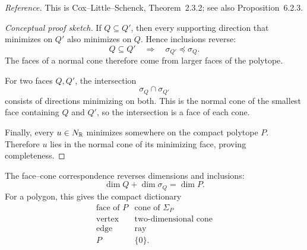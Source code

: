 \noindent
\textit{Reference.}
This is Cox--Little--Schenck, Theorem~2.3.2; see also
Proposition~6.2.3.

\begin{proof}[Conceptual proof sketch]
If \(Q\subseteq Q'\), then every supporting direction that minimizes
on \(Q'\) also minimizes on \(Q\). Hence inclusions reverse:
\[
Q\subseteq Q'
\quad\Longrightarrow\quad
\sigma_{Q'}\preceq\sigma_Q.
\]
The faces of a normal cone therefore come from larger faces of the
polytope.

For two faces \(Q,Q'\), the intersection
\[
\sigma_Q\cap\sigma_{Q'}
\]
consists of directions minimizing on both. This is the normal cone of
the smallest face containing \(Q\) and \(Q'\), so the intersection is
a face of each cone.

Finally, every \(u\in N_{\mathbb{R}}\) minimizes somewhere on the compact
polytope \(P\). Therefore \(u\) lies in the normal cone of its
minimizing face, proving completeness.
\end{proof}

The face--cone correspondence reverses dimensions and inclusions:
\[
\boxed{
\dim Q+\dim\sigma_Q=\dim P.
}
\]
For a polygon, this gives the compact dictionary
\[
\begin{array}{c|c}
\text{face of }P
&
\text{cone of }\Sigma_P
\\
\hline
\text{vertex}
&
\text{two-dimensional cone}
\\
\text{edge}
&
\text{ray}
\\
P
&
\{0\}.
\end{array}
\]

